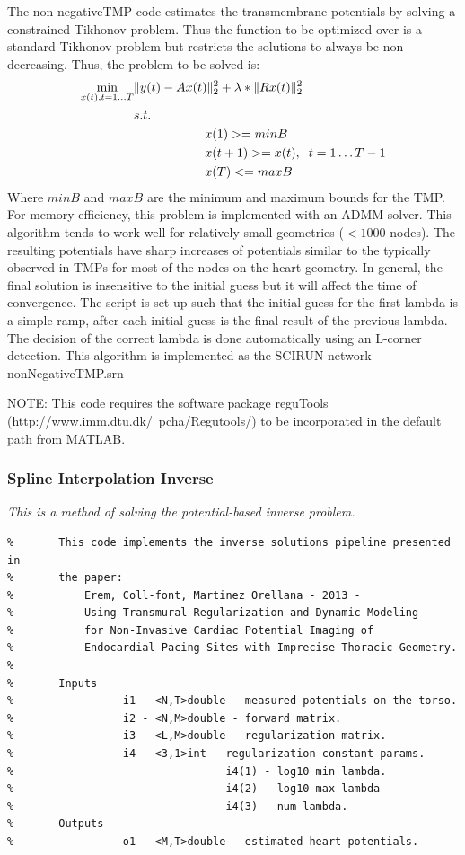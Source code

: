 \documentclass[fleqn,11pt,openany]{book}
\begin{document}
The non-negativeTMP code estimates the transmembrane potentials by solving a constrained Tikhonov problem.
Thus the function to be optimized over is a standard Tikhonov problem but restricts the solutions to always be non-decreasing.
Thus, the problem to be solved is:
\begin{equation}\begin{split}
		\min_{x(t), t=1\dots T} &\|y(t) - Ax(t)\|_2^2 + \lambda*\|Rx(t)\|_2^2 \\
		&s.t.\\
   		&\hspace{2cm}x(1) >= minB\\
     	&\hspace{2cm}x(t+1) >= x(t), \hspace{.2cm}t=1\dots T-1\\
     	&\hspace{2cm}x(T) <= maxB
\end{split}
\end{equation}
Where $minB$ and $maxB$ are the minimum and maximum bounds for the TMP.
For memory efficiency, this problem is implemented with an ADMM solver.
This algorithm tends to work well for relatively small geometries ($<1000$ nodes).
The resulting potentials have sharp increases of potentials similar to the typically observed in TMPs 
for most of the nodes on the heart geometry.
In general, the final solution is insensitive to the initial guess but it will affect the time of convergence.
The script is set up such that the initial guess for the first lambda is a simple ramp, after each initial guess is the final result of the previous lambda. 
The decision of the correct lambda is done automatically using an L-corner detection.
This algorithm is implemented as the SCIRUN network nonNegativeTMP.srn

NOTE: This code requires the software package reguTools (http://www.imm.dtu.dk/~pcha/Regutools/) to be incorporated in the default path from MATLAB.

\subsubsection{Spline Interpolation Inverse}

\vspace{5pt}\textit{This is a method of solving the potential-based inverse problem.}\vspace{5pt}
\begin{verbatim}
%		This code implements the inverse solutions pipeline presented in
%		the paper:
%	        Erem, Coll-font, Martinez Orellana - 2013 - 
%	        Using Transmural Regularization and Dynamic Modeling 
%	        for Non-Invasive Cardiac Potential Imaging of 
%	        Endocardial Pacing Sites with Imprecise Thoracic Geometry.
%
%		Inputs
%				  i1 - <N,T>double - measured potentials on the torso.
%				  i2 - <N,M>double - forward matrix.
%				  i3 - <L,M>double - regularization matrix.
%				  i4 - <3,1>int - regularization constant params.
%				                  i4(1) - log10 min lambda.
%				                  i4(2) - log10 max lambda
%				                  i4(3) - num lambda.
%		Outputs
%				  o1 - <M,T>double - estimated heart potentials.
\end{verbatim}
\end{document}
